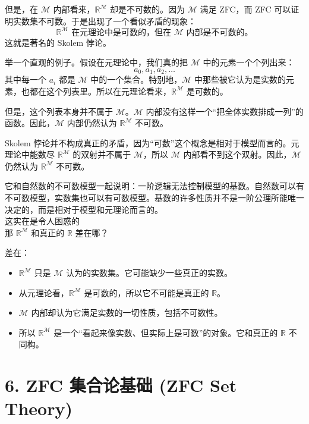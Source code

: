 \documentclass[12pt, a4paper]{article}
\begin{document}
但是，在 \(\mathcal{M}\) 内部看来，\(\mathbb{R}^{\mathcal{M}}\) 却是不可数的。因为 \(\mathcal{M}\) 满足 ZFC，而 ZFC 可以证明实数集不可数。于是出现了一个看似矛盾的现象：
\[
\mathbb{R}^{\mathcal{M}}\text{ 在元理论中是可数的，但在 }\mathcal{M}\text{ 内部是不可数的。}
\]
这就是著名的 Skolem 悖论。

举一个直观的例子。假设在元理论中，我们真的把 \(\mathcal{M}\) 中的元素一个个列出来：
\[
a_0, a_1, a_2, \dots
\]
其中每一个 \(a_i\) 都是 \(\mathcal{M}\) 中的一个集合。特别地，\(\mathcal{M}\) 中那些被它认为是实数的元素，也都在这个列表里。所以在元理论看来，\(\mathbb{R}^{\mathcal{M}}\) 是可数的。

但是，这个列表本身并不属于 \(\mathcal{M}\)。\(\mathcal{M}\) 内部没有这样一个“把全体实数排成一列”的函数。因此，\(\mathcal{M}\) 内部仍然认为 \(\mathbb{R}^{\mathcal{M}}\) 不可数。

Skolem 悖论并不构成真正的矛盾，因为“可数”这个概念是相对于模型而言的。元理论中能数尽 \(\mathbb{R}^{\mathcal{M}}\) 的双射并不属于 \(\mathcal{M}\)，所以 \(\mathcal{M}\) 内部看不到这个双射。因此，\(\mathcal{M}\) 仍然认为 \(\mathbb{R}^{\mathcal{M}}\) 不可数。

它和自然数的不可数模型一起说明：一阶逻辑无法控制模型的基数。自然数可以有不可数模型，实数集也可以有可数模型。基数的许多性质并不是一阶公理所能唯一决定的，而是相对于模型和元理论而言的。 \\

这实在是令人困惑的 \\
那 \(\mathbb{R}^{\mathcal{M}}\) 和真正的 \(\mathbb{R}\) 差在哪？

差在：
\begin{itemize}
    \item \(\mathbb{R}^{\mathcal{M}}\) 只是 \(\mathcal{M}\) 认为的实数集。它可能缺少一些真正的实数。

    \item 从元理论看，\(\mathbb{R}^{\mathcal{M}}\) 是可数的，所以它不可能是真正的 \(\mathbb{R}\)。

    \item \(\mathcal{M}\) 内部却认为它满足实数的一切性质，包括不可数性。

    \item 所以 \(\mathbb{R}^{\mathcal{M}}\) 是一个“看起来像实数、但实际上是可数”的对象。它和真正的 \(\mathbb{R}\) 不同构。

\end{itemize}

\section*{6. ZFC 集合论基础 (ZFC Set Theory)}
\end{document}
